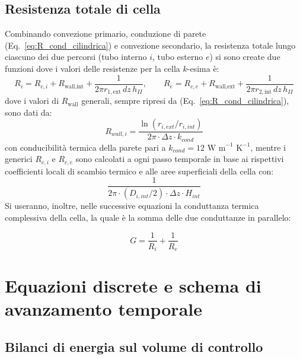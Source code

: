 \documentclass[12pt]{report}
\begin{document}
\subsection{Resistenza totale di cella}

Combinando convezione primario, conduzione di parete (Eq.~\ref{eq:R_cond_cilindrica}) e convezione secondario, la resistenza totale lungo ciascuno dei due percorsi (tubo interno $i$, tubo esterno $e$) si sono create due funzioni dove i valori delle resistenze per la cella $k$-esima è:
\begin{equation}
    R_{i} = R_{c,i} + R_{\text{wall,int}} + \frac{1}{2\pi r_{1,\text{ext}}\, dz\, h_{II}}, \qquad
    R_{e} = R_{c,e} + R_{\text{wall,ext}} + \frac{1}{2\pi r_{2,\text{int}}\, dz\, h_{II}}
    \label{eq:R_totali}
\end{equation}
dove i valori di $R_{\text{wall}}$ generali, sempre ripresi da (Eq.~\ref{eq:R_cond_cilindrica}), sono dati da:
\begin{equation}
    R_{wall,i} = \frac{\ln(r_{i,ext}/r_{i,int})}{2\pi \cdot \Delta z \cdot k_{cond}}
\end{equation}
con conducibilità termica della parete pari a $k_{cond} = 12\text{ W m}^{-1}\text{ K}^{-1}$, mentre i generici $R_{c,i}$ e $R_{c,e}$ sono calcolati a ogni passo temporale in base ai rispettivi coefficienti locali di scambio termico e alle aree superficiali della cella con:
\begin {equation}
    \frac{1}{2\pi \cdot (D_{i,int}/2) \cdot \Delta z \cdot H_{int}}
\end{equation}
Si useranno, inoltre, nelle successive equazioni la conduttanza termica complessiva della cella, la quale è la somma delle due conduttanze in parallelo:

\begin{equation}
    G = \frac{1}{R_i} + \frac{1}{R_e}
    \label{eq:G_cella}
\end{equation}


\section{Equazioni discrete e schema di avanzamento temporale}
\label{sec:equazioni_discrete}

\subsection{Bilanci di energia sul volume di controllo}
\end{document}
